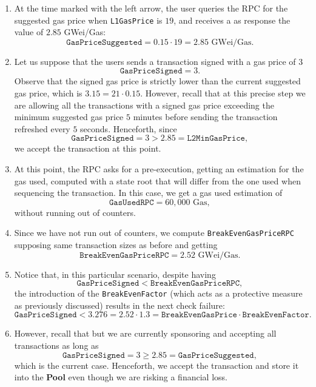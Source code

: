 \begin{enumerate}

\item At the time marked with the left arrow, the user queries the RPC for the suggested gas price when \texttt{L1GasPrice} is $19$, and receives a as response the value of $2.85$ GWei/Gas:
\[
\texttt{GasPriceSuggested} = 0.15 \cdot 19 = 2.85 \text{ GWei/Gas}.
\]

\item Let us suppose that the users sends a transaction signed with a gas price of $3$
\[
\texttt{GasPriceSigned} = 3.
\]
Observe that the signed gas price is strictly lower than the current suggested gas price, which is $3.15 = 21 \cdot 0.15$. However, recall that at this precise step we are allowing all the transactions with a signed gas price exceeding the minimum suggested gas price $5$ minutes before sending the transaction refreshed every $5$ seconds. Henceforth, since
\[
\texttt{GasPriceSigned} = 3 > 2.85 = \texttt{L2MinGasPrice},
\]
we accept the transaction at this point.

\item At this point, the RPC asks for a pre-execution, getting an estimation for the gas used, computed with a state root that will differ from the one used when sequencing the transaction. In this case, we get a gas used estimation of
\[
\texttt{GasUsedRPC} = 60,000 \text{ Gas},
\]
without running out of counters.

\item Since we have not run out of counters, we compute \texttt{BreakEvenGasPriceRPC} supposing same transaction sizes as before and getting
\[
\texttt{BreakEvenGasPriceRPC} = 2.52 \text{ GWei/Gas}.
\]

\item Notice that, in this particular scenario, despite having
\[
\texttt{GasPriceSigned} < \texttt{BreakEvenGasPriceRPC},
\]
the introduction of the \texttt{BreakEvenFactor} (which acts as a protective measure as previously discussed) results in the next check failure:
\[
\texttt{GasPriceSigned} < 3.276 = 2.52 \cdot 1.3 = \texttt{BreakEvenGasPrice} \cdot \texttt{BreakEvenFactor}.
\]

\item However, recall that but we are currently sponsoring and accepting all transactions as long as
\[
\texttt{GasPriceSigned} = 3 \geq 2.85 = \texttt{GasPriceSuggested},
\]
which is the current case. Henceforth, we accept the transaction and store it into the \textbf{Pool} even though we are risking a financial loss.

\end{enumerate}



